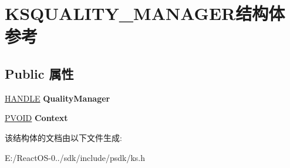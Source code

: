 \hypertarget{struct_k_s_q_u_a_l_i_t_y___m_a_n_a_g_e_r}{}\section{K\+S\+Q\+U\+A\+L\+I\+T\+Y\+\_\+\+M\+A\+N\+A\+G\+E\+R结构体 参考}
\label{struct_k_s_q_u_a_l_i_t_y___m_a_n_a_g_e_r}
\subsection*{Public 属性}
\begin{DoxyCompactItemize}
\item 
\mbox{\label{struct_k_s_q_u_a_l_i_t_y___m_a_n_a_g_e_r_a651005190b4905523baf47adeacd4c13}} 
\hyperlink{interfacevoid}{H\+A\+N\+D\+LE} {\bfseries Quality\+Manager}
\item 
\mbox{\label{struct_k_s_q_u_a_l_i_t_y___m_a_n_a_g_e_r_a1377768fb623f9f7d60741356e765ff1}} 
\hyperlink{interfacevoid}{P\+V\+O\+ID} {\bfseries Context}
\end{DoxyCompactItemize}


该结构体的文档由以下文件生成\+:\begin{DoxyCompactItemize}
\item 
E\+:/\+React\+O\+S-\/0../sdk/include/psdk/ks.\+h\end{DoxyCompactItemize}
